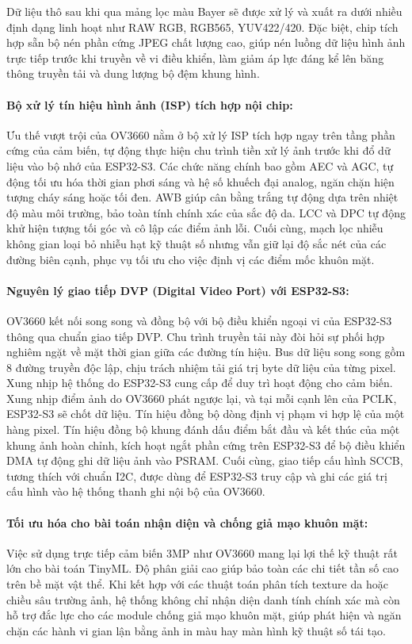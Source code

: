 Dữ liệu thô sau khi qua mảng lọc màu Bayer sẽ được xử lý và xuất ra dưới nhiều định dạng linh hoạt như RAW RGB, RGB565, YUV422/420. Đặc biệt, chip tích hợp sẵn bộ nén phần cứng JPEG chất lượng cao, giúp nén luồng dữ liệu hình ảnh trực tiếp trước khi truyền về vi điều khiển, làm giảm áp lực đáng kể lên băng thông truyền tải và dung lượng bộ đệm khung hình.

\paragraph{Bộ xử lý tín hiệu hình ảnh (ISP) tích hợp nội chip:}
Ưu thế vượt trội của OV3660 nằm ở bộ xử lý ISP tích hợp ngay trên tầng phần cứng của cảm biến, tự động thực hiện chu trình tiền xử lý ảnh trước khi đổ dữ liệu vào bộ nhớ của ESP32-S3. Các chức năng chính bao gồm AEC và AGC, tự động tối ưu hóa thời gian phơi sáng và hệ số khuếch đại analog, ngăn chặn hiện tượng cháy sáng hoặc tối đen. AWB giúp cân bằng trắng tự động dựa trên nhiệt độ màu môi trường, bảo toàn tính chính xác của sắc độ da. LCC và DPC tự động khử hiện tượng tối góc và cô lập các điểm ảnh lỗi. Cuối cùng, mạch lọc nhiễu không gian loại bỏ nhiễu hạt kỹ thuật số nhưng vẫn giữ lại độ sắc nét của các đường biên cạnh, phục vụ tối ưu cho việc định vị các điểm mốc khuôn mặt.

\paragraph{Nguyên lý giao tiếp DVP (Digital Video Port) với ESP32-S3:}
OV3660 kết nối song song và đồng bộ với bộ điều khiển ngoại vi của ESP32-S3 thông qua chuẩn giao tiếp DVP. Chu trình truyền tải này đòi hỏi sự phối hợp nghiêm ngặt về mặt thời gian giữa các đường tín hiệu. Bus dữ liệu song song gồm 8 đường truyền độc lập, chịu trách nhiệm tải giá trị byte dữ liệu của từng pixel. Xung nhịp hệ thống do ESP32-S3 cung cấp để duy trì hoạt động cho cảm biến. Xung nhịp điểm ảnh do OV3660 phát ngược lại, và tại mỗi cạnh lên của PCLK, ESP32-S3 sẽ chốt dữ liệu. Tín hiệu đồng bộ dòng định vị phạm vi hợp lệ của một hàng pixel. Tín hiệu đồng bộ khung đánh dấu điểm bắt đầu và kết thúc của một khung ảnh hoàn chỉnh, kích hoạt ngắt phần cứng trên ESP32-S3 để bộ điều khiển DMA tự động ghi dữ liệu ảnh vào PSRAM. Cuối cùng, giao tiếp cấu hình SCCB, tương thích với chuẩn I2C, được dùng để ESP32-S3 truy cập và ghi các giá trị cấu hình vào hệ thống thanh ghi nội bộ của OV3660.

\paragraph{Tối ưu hóa cho bài toán nhận diện và chống giả mạo khuôn mặt:}
Việc sử dụng trực tiếp cảm biến 3MP như OV3660 mang lại lợi thế kỹ thuật rất lớn cho bài toán TinyML. Độ phân giải cao giúp bảo toàn các chi tiết tần số cao trên bề mặt vật thể. Khi kết hợp với các thuật toán phân tích texture da hoặc chiều sâu trường ảnh, hệ thống không chỉ nhận diện danh tính chính xác mà còn hỗ trợ đắc lực cho các module chống giả mạo khuôn mặt, giúp phát hiện và ngăn chặn các hành vi gian lận bằng ảnh in màu hay màn hình kỹ thuật số tái tạo.

